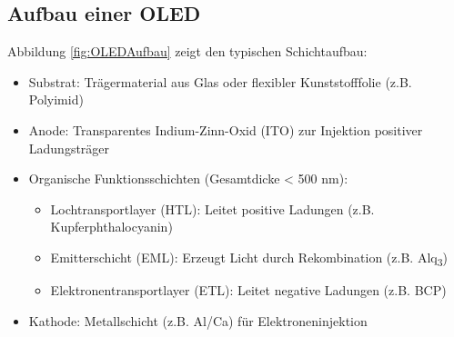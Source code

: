 \subsection{Aufbau einer OLED}
Abbildung \ref{fig:OLEDAufbau} zeigt den typischen Schichtaufbau:
\begin{itemize}
	\item Substrat: Trägermaterial aus Glas oder flexibler Kunststofffolie (z.B. Polyimid)
	\item Anode: Transparentes Indium-Zinn-Oxid (ITO) zur Injektion positiver Ladungsträger
	\item Organische Funktionsschichten (Gesamtdicke < 500 nm):
	\begin{itemize}
		\item Lochtransportlayer (HTL): Leitet positive Ladungen (z.B. Kupferphthalocyanin)
		\item Emitterschicht (EML): Erzeugt Licht durch Rekombination (z.B. Alq\textsubscript{3})
		\item Elektronentransportlayer (ETL): Leitet negative Ladungen (z.B. BCP)
	\end{itemize}
	\item Kathode: Metallschicht (z.B. Al/Ca) für Elektroneninjektion
\end{itemize}
\cite{Bartlett:2023} \cite{Stotz:2019} \cite{Wellmann:2017}

